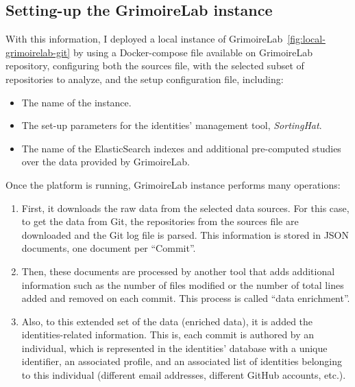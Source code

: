 \documentclass[a4paper, 12pt]{book}
\begin{document}
\subsection{Setting-up the GrimoireLab instance}
\label{ssec:setting-grimoirelab}

With this information, I deployed a local instance of GrimoireLab~\ref{fig:local-grimoirelab-git} by using a Docker-compose file available on GrimoireLab repository, configuring both the sources file, with the selected subset of repositories to analyze, and the setup configuration file, including:
\begin{itemize}
    \item The name of the instance.
    \item The set-up parameters for the identities' management tool, \emph{SortingHat}.
    \item The name of the ElasticSearch indexes and additional pre-computed studies over the data provided by GrimoireLab.
\end{itemize}

Once the platform is running, GrimoireLab instance performs many operations:
\begin{enumerate}
    \item First, it downloads the raw data from the selected data sources. For this case, to get the data from Git, the repositories from the sources file are downloaded and the Git log file is parsed. This information is stored in JSON documents, one document per ``Commit''.
    \item Then, these documents are processed by another tool that adds additional information such as the number of files modified or the number of total lines added and removed on each commit. This process is called ``data enrichment''.
    \item Also, to this extended set of the data (enriched data), it is added the identities-related information. This is, each commit is authored by an individual, which is represented in the identities' database with a unique identifier, an associated profile, and an associated list of identities belonging to this individual (different email addresses, different GitHub accounts, etc.).
\end{enumerate}
\end{document}
